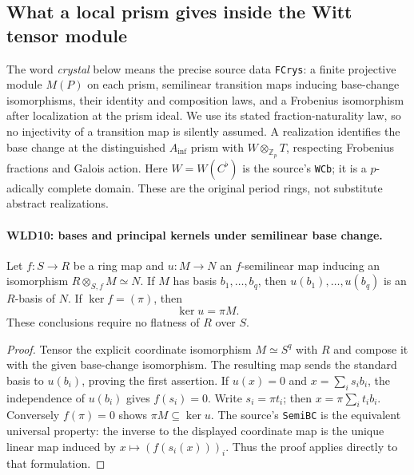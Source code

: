 \documentclass[11pt,a4paper]{article}
\numberwithin{equation}{section}
\theoremstyle{remark}\newtheorem{remark}[theorem]{Remark}
\begin{document}
\subsection{What a local prism gives inside the Witt tensor module}

The word \emph{crystal} below means the precise source data
\texttt{FCrys}: a finite projective module $M(P)$ on each prism,
semilinear transition maps inducing base-change isomorphisms, their
identity and composition laws, and a Frobenius isomorphism after
localization at the prism ideal. We use its stated fraction-naturality
law, so no injectivity of a transition map is silently assumed.
A realization identifies the base change at the distinguished
$A_{\inf}$ prism with $W\otimes_{\mathbb Z_p}T$, respecting Frobenius
fractions and Galois action. Here $W=W(C^\flat)$ is the source's
\texttt{WCb}; it is a $p$-adically complete domain. These are the
original period rings, not substitute abstract realizations.

\paragraph{WLD10: bases and principal kernels under semilinear base change.}
\label{claim:WLD10}
Let $f:S\to R$ be a ring map and $u:M\to N$ an $f$-semilinear map
inducing an isomorphism $R\otimes_{S,f}M\simeq N$. If $M$ has
basis $b_1,\ldots,b_q$, then $u(b_1),\ldots,u(b_q)$ is an
$R$-basis of $N$. If $\ker f=(\pi)$, then
\[
                            \ker u=\pi M.                \tag{WLD.12}
\]
These conclusions require no flatness of $R$ over $S$.

\begin{proof}
Tensor the explicit coordinate isomorphism $M\simeq S^q$ with $R$
and compose it with the given base-change isomorphism.
The resulting map sends the standard basis to $u(b_i)$, proving
the first assertion. If $u(x)=0$ and $x=\sum_i s_ib_i$,
the independence of $u(b_i)$ gives $f(s_i)=0$. Write
$s_i=\pi t_i$; then $x=\pi\sum_i t_ib_i$. Conversely
$f(\pi)=0$ shows $\pi M\subseteq\ker u$.
The source's \texttt{Semi\allowbreak BC} is the equivalent universal property:
the inverse to the displayed coordinate map is the unique linear
map induced by $x\mapsto(f(s_i(x)))_i$. Thus the proof applies
directly to that formulation.
\end{proof}

\end{document}
